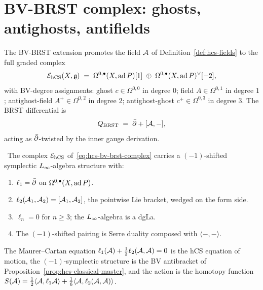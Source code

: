 \section{BV-BRST complex: ghosts, antighosts, antifields}
\label{sec:hcs-bv-brst}

\begin{definition}
\label{def:hcs-bv-brst}
%
The BV-BRST extension promotes the field $\mathcal{A}$ of
Definition~\ref{def:hcs-fields} to the full graded complex
\begin{equation}
\label{eq:hcs-bv-brst-complex}
 \mathcal{E}_{\mathrm{hCS}}(X,\mathfrak{g})
 \;=\; \Omega^{0,\bullet}(X,\mathrm{ad}\,P)[1]
 \;\oplus\;
 \Omega^{0,\bullet}(X,\mathrm{ad}\,P)^\vee[-2],
\end{equation}
with BV-degree assignments: ghost $c\in\Omega^{0,0}$ in degree $0$;
field $A\in\Omega^{0,1}$ in degree $1$; antighost-field
$A^+\in\Omega^{0,2}$ in degree $2$; antighost-ghost $c^+\in\Omega^{0,3}$
in degree $3$. The BRST differential is
\begin{equation}
\label{eq:hcs-brst}
 Q_{\mathrm{BRST}} \;=\; \bar\partial + [\mathcal{A},-],
\end{equation}
acting as $\bar\partial$-twisted by the inner gauge derivation.
\end{definition}

\begin{theorem}
\label{thm:hcs-classical-linfty}
%
%
\ClaimStatusProvedElsewhere\,\cite{CostelloGwilliam2017}
The complex $\mathcal{E}_{\mathrm{hCS}}$ of~\eqref{eq:hcs-bv-brst-complex} carries a
$(-1)$-shifted symplectic $L_\infty$-algebra structure with:
\begin{enumerate}[label=\textup{(\roman*)}]
 \item $\ell_1 = \bar\partial$ on $\Omega^{0,\bullet}(X,\mathrm{ad}\,P)$.
 \item $\ell_2(\mathcal{A}_1,\mathcal{A}_2) = [\mathcal{A}_1,\mathcal{A}_2]$, the pointwise Lie
 bracket, wedged on the form side.
 \item $\ell_n = 0$ for $n\ge 3$; the $L_\infty$-algebra is a
 dgLa.
 \item The $(-1)$-shifted pairing is Serre duality composed with
 $\langle-,-\rangle$.
\end{enumerate}
The Maurer--Cartan equation $\ell_1(\mathcal{A})+\tfrac{1}{2}\ell_2(\mathcal{A},\mathcal{A})=0$
is the hCS equation of motion, the
$(-1)$-symplectic structure is the BV antibracket of
Proposition~\ref{prop:hcs-classical-master}, and the action
is the homotopy function $S(\mathcal{A}) = \tfrac{1}{2}\langle\mathcal{A},\ell_1\mathcal{A}\rangle
+\tfrac{1}{6}\langle\mathcal{A},\ell_2(\mathcal{A},\mathcal{A})\rangle$.
\end{theorem}

